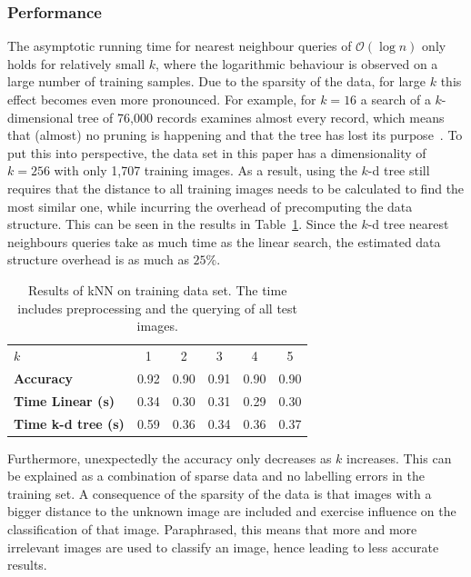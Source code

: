 \subsubsection{Performance}
The asymptotic running time for nearest neighbour queries of \(\mathcal{O}(\log n)\) only holds for relatively small \(k\), where the logarithmic behaviour is observed on a large number of training samples.
Due to the sparsity of the data, for large \(k\) this effect becomes even more pronounced.
For example, for \(k = 16\) a search of a \(k\)-dimensional tree of 76,000 records examines almost every record, which means that (almost) no pruning is happening and that the tree has lost its purpose~\cite{Sproull1991}.
To put this into perspective, the data set in this paper has a dimensionality of \(k = 256\) with only 1,707 training images.
As a result, using the \(k\)-d tree still requires that the distance to all training images needs to be calculated to find the most similar one, while incurring the overhead of precomputing the data structure.
This can be seen in the results in Table~\ref{tab:knn_anthon}.
Since the \(k\)-d tree nearest neighbours queries take as much time as the linear search, the estimated data structure overhead is as much as \(25\% \).
\begin{table}[H]
    \centering
    \caption{Results of kNN on training data set. The time includes preprocessing and the querying of all test images.}\label{tab:knn_anthon}
    \begin{tabular}{l c c c c c}
        \toprule
        \textbf{\(k\)}             & 1    & 2    & 3    & 4    & 5    \\
        \textbf{Accuracy}          & 0.92 & 0.90 & 0.91 & 0.90 & 0.90 \\
        \textbf{Time Linear (s)}   & 0.34 & 0.30 & 0.31 & 0.29 & 0.30 \\
        \textbf{Time k-d tree (s)} & 0.59 & 0.36 & 0.34 & 0.36 & 0.37 \\ \bottomrule
    \end{tabular}
\end{table}
Furthermore, unexpectedly the accuracy only decreases as \(k\) increases.
This can be explained as a combination of sparse data and no labelling errors in the training set.
A consequence of the sparsity of the data is that images with a bigger distance to the unknown image are included and exercise influence on the classification of that image. Paraphrased, this means that more and more irrelevant images are used to classify an image, hence leading to less accurate results.

